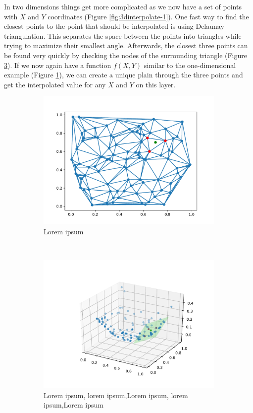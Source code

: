 In two dimensions things get more complicated as we now have a set of points with $X$ and $Y$ coordinates (Figure \ref{fig:3dinterpolate-1}). One fast way to find the closest points to the point that should be interpolated is using Delaunay triangulation. This separates the space between the points into triangles while trying to maximize their smallest angle. Afterwards, the closest three points can be found very quickly by checking the nodes of the surrounding triangle  (Figure \ref{fig:3dinterpolate-2}). If we now again have a function $f(X,Y)$ similar to the one-dimensional example (Figure \ref{fig:3dinterpolate-3}), we can create a unique plain through the three points and get the interpolated value for any $X$ and $Y$ on this layer.


\begin{figure}[h] %
	\centering
	\begin{subfigure}[t]{0.5\textwidth}
		\centering
		\includegraphics[width=\linewidth]{images/vis2d2.pdf}
		\caption{Lorem ipsum}
	\label{fig:3dinterpolate-3}
	\end{subfigure}%
	~ 
	\begin{subfigure}[t]{0.5\textwidth}
		\centering
		\includegraphics[width=\linewidth]{images/vis2d3.pdf}
		\caption{Lorem ipsum, lorem ipsum,Lorem ipsum, lorem ipsum,Lorem ipsum}
		\label{fig:3dinterpolate-2}
	\end{subfigure}
	\caption{}


\end{figure}
